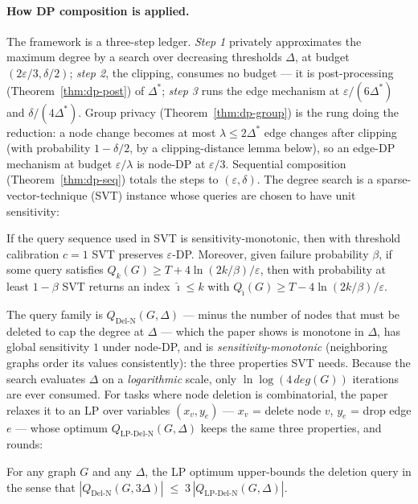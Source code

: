 \paragraph{How DP composition is applied.}
The framework is a three-step ledger. \emph{Step 1} privately approximates the maximum
degree by a search over decreasing thresholds $\Delta$, at budget
$(2\varepsilon/3, \delta/2)$; \emph{step 2}, the clipping, consumes no budget --- it is
post-processing (Theorem~\ref{thm:dp-post}) of $\Delta^*$; \emph{step 3} runs the edge
mechanism at $\varepsilon/(6\Delta^*)$ and $\delta/(4\Delta^*)$. Group privacy
(Theorem~\ref{thm:dp-group}) is the rung doing the reduction: a node change becomes at
most $\lambda \le 2\Delta^*$ edge changes after clipping (with probability
$1-\delta/2$, by a clipping-distance lemma below), so an edge-DP mechanism at budget
$\varepsilon/\lambda$ is node-DP at $\varepsilon/3$. Sequential composition
(Theorem~\ref{thm:dp-seq}) totals the steps to $(\varepsilon,\delta)$. The degree
search is a sparse-vector-technique (SVT) instance whose queries are chosen to have
unit sensitivity:

\begin{lemma}\label{lem:dp-337-svt}
If the query sequence used in SVT is sensitivity-monotonic, then with threshold
calibration $c=1$ SVT preserves $\varepsilon$-DP. Moreover, given failure probability
$\beta$, if some query satisfies $Q_k(G) \ge T + 4\ln(2k/\beta)/\varepsilon$, then with
probability at least $1-\beta$ SVT returns an index $\hat\imath \le k$ with
$Q_{\hat\imath}(G) \ge T - 4\ln(2k/\beta)/\varepsilon$. \eop
\end{lemma}

The query family is $Q_{\mathrm{Del\text{-}N}}(G,\Delta)$ --- minus the number of
nodes that must be deleted to cap the degree at $\Delta$ --- which the paper shows is
monotone in $\Delta$, has global sensitivity $1$ under node-DP, and is
\emph{sensitivity-monotonic} (neighboring graphs order its values consistently): the
three properties SVT needs. Because the search evaluates $\Delta$ on a
\emph{logarithmic} scale, only $\ln\log(4\,\mathit{deg}(G))$ iterations are ever
consumed. For tasks where node deletion is combinatorial, the paper relaxes it to an
LP over variables $(x_v, y_e)$ --- $x_v$ = delete node $v$, $y_e$ = drop edge $e$ ---
whose optimum $Q_{\mathrm{LP\text{-}Del\text{-}N}}(G,\Delta)$ keeps the same three
properties, and rounds:

\begin{lemma}\label{lem:dp-337-lp}
For any graph $G$ and any $\Delta$, the LP optimum upper-bounds the deletion query in
the sense that
$|Q_{\mathrm{Del\text{-}N}}(G, 3\Delta)| \;\le\; 3\,|Q_{\mathrm{LP\text{-}Del\text{-}N}}(G,\Delta)|$. \eop
\end{lemma}

